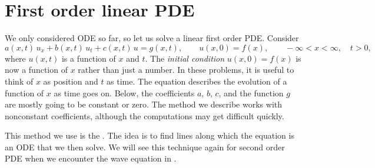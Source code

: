 \sectionnewpage
\section{First order linear PDE}
\label{fopde:section}


We only considered ODE so far, so let us solve a linear first order
PDE\@.  Consider
\begin{equation*}
a(x,t) \, u_x + b(x,t) \, u_t + c(x,t) \, u = g(x,t), \qquad u(x,0) = f(x) , \qquad -\infty < x < \infty,
\quad t > 0 ,
\end{equation*}
where $u(x,t)$ is a function of $x$ and $t$.
The \emph{initial condition}
$u(x,0) = f(x)$ is now a function of $x$ rather than just a number.
In these problems, it is useful to think of $x$ as position and $t$ as time.
The equation describes the evolution of a function of $x$ as
time goes on.
Below, the coefficients $a$, $b$, $c$, and the function $g$
are mostly going to be constant or zero.  
The method we describe works with nonconstant coefficients,
although the computations may get difficult quickly.

This method we use is the
\emph{}.
The idea is to find lines along which the equation is
an ODE that we then solve.
We will see this technique again for second order PDE
when we encounter the wave equation in .

